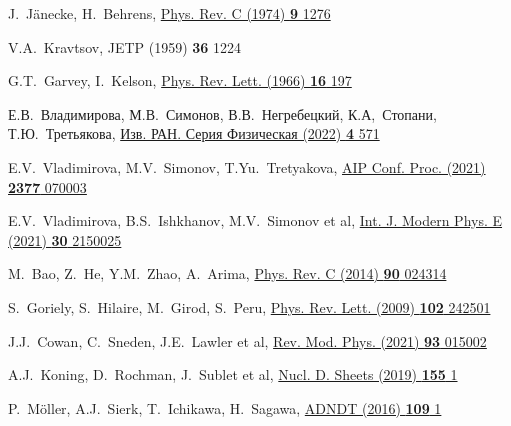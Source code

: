 \begin{thebibliography}{9}
J.~J{\"a}necke, H.~Behrens,
\href{https://doi.org/10.1103/PhysRevC.9.1276}
  {Phys. Rev. C (1974) \textbf{9} 1276}

V.A.~Kravtsov,
JETP (1959) \textbf{36} 1224

G.T.~Garvey, I.~Kelson,
\href{https://doi.org/10.1103/PhysRevLett.16.197}
  {Phys. Rev. Lett. (1966) \textbf{16} 197}

Е.В.~Владимирова, М.В.~Симонов, В.В.~Негребецкий, К.А,~Стопани, Т.Ю.~Третьякова,
\href{https://doi.org/10.31857/S0367676522040263}
  {Изв. РАН. Серия Физическая (2022) \textbf{4} 571}

E.V.~Vladimirova, M.V.~Simonov, T.Yu.~Tretyakova,
\href{https://doi.org/10.1063/5.0063340}
  {AIP Conf. Proc. (2021) \textbf{2377} 070003}

E.V.~Vladimirova, B.S.~Ishkhanov, M.V.~Simonov et al,
\href{https://doi.org/10.1142/S0218301321500257}
  {Int. J. Modern Phys. E (2021) \textbf{30} 2150025}

M.~Bao, Z.~He, Y.M.~Zhao, A.~Arima,
\href{https://doi.org/10.1103/PhysRevC.90.024314}
  {Phys. Rev. C (2014) \textbf{90} 024314}

S.~Goriely, S.~Hilaire, M.~Girod, S.~Peru,
\href{https://doi.org/10.1103/PhysRevLett.102.242501}
  {Phys. Rev. Lett. (2009) \textbf{102} 242501}

J.J.~Cowan, C.~Sneden, J.E.~Lawler et al,
\href{https://doi.org/10.1103/RevModPhys.93.015002}{Rev. Mod. Phys. (2021) \textbf{93} 015002}

A.J.~Koning, D.~Rochman, J.~Sublet et al,
\href{https://doi.org/10.1016/j.nds.2019.01.002}
  {Nucl. D. Sheets (2019) \textbf{155} 1}


P.~Möller, A.J.~Sierk, T.~Ichikawa, H.~Sagawa,
\href{https://doi.org/10.1016/j.adt.2015.10.002}
  {ADNDT (2016) \textbf{109} 1}


\end{thebibliography}
